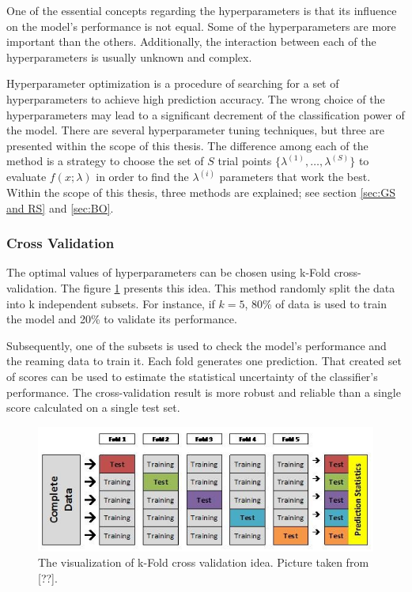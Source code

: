 One of the essential concepts regarding the hyperparameters is that its influence on the model's performance is not equal. Some of the hyperparameters are more important than the others. Additionally, the interaction between each of the hyperparameters is usually unknown and complex. 

Hyperparameter optimization is a procedure of searching for a set of hyperparameters to achieve high prediction accuracy. The wrong choice of the hyperparameters may lead to a significant decrement of the classification power of the model. There are several hyperparameter tuning techniques, but three are presented within the scope of this thesis. The difference among each of the method is a strategy to choose the set of $S$ trial points $\{\lambda^{(1)}, \ldots , \lambda^{(S)} \}$ to evaluate $f(x;\lambda)$ in order to find the $\lambda^{(i)}$ parameters that work the best. Within the scope of this thesis, three methods are explained; see section \ref{sec:GS and RS} and \ref{sec:BO}.  

\subsubsection{Cross Validation}
The optimal values of hyperparameters can be chosen using k-Fold cross-validation. The figure \ref{fig:CV} presents this idea. This method randomly split the data into k independent subsets. For instance, if $k = 5$, 80\% of data is used to train the model and 20\% to validate its performance.   

Subsequently, one of the subsets is used to check the model's performance and the reaming data to train it. Each fold generates one prediction. That created set of scores can be used to estimate the statistical uncertainty of the classifier's performance. The cross-validation result is more robust and reliable than a single score calculated on a single test set.   

\begin{figure}[h]
\centering
\includegraphics{figures/CV.PNG}
\caption{ The visualization of k-Fold cross validation idea. Picture taken from [??].
\label{fig:CV}}
\end{figure}

